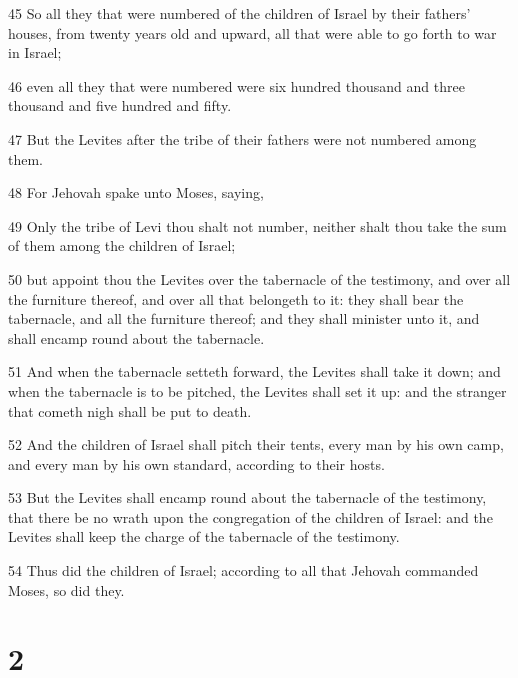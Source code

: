 \par 45 So all they that were numbered of the children of Israel by their fathers' houses, from twenty years old and upward, all that were able to go forth to war in Israel;
\par 46 even all they that were numbered were six hundred thousand and three thousand and five hundred and fifty.
\par 47 But the Levites after the tribe of their fathers were not numbered among them.
\par 48 For Jehovah spake unto Moses, saying,
\par 49 Only the tribe of Levi thou shalt not number, neither shalt thou take the sum of them among the children of Israel;
\par 50 but appoint thou the Levites over the tabernacle of the testimony, and over all the furniture thereof, and over all that belongeth to it: they shall bear the tabernacle, and all the furniture thereof; and they shall minister unto it, and shall encamp round about the tabernacle.
\par 51 And when the tabernacle setteth forward, the Levites shall take it down; and when the tabernacle is to be pitched, the Levites shall set it up: and the stranger that cometh nigh shall be put to death.
\par 52 And the children of Israel shall pitch their tents, every man by his own camp, and every man by his own standard, according to their hosts.
\par 53 But the Levites shall encamp round about the tabernacle of the testimony, that there be no wrath upon the congregation of the children of Israel: and the Levites shall keep the charge of the tabernacle of the testimony.
\par 54 Thus did the children of Israel; according to all that Jehovah commanded Moses, so did they.

\chapter{2}

